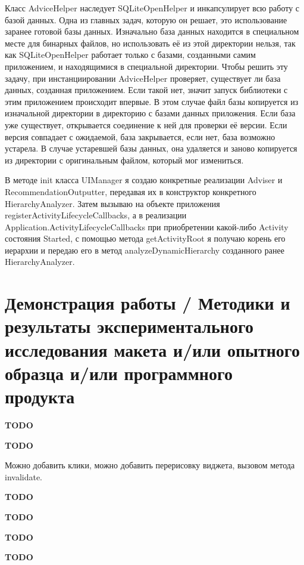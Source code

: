 \documentclass[a4paper,14pt]{extarticle} %
\begin{document}
	Класс AdviceHelper наследует SQLiteOpenHelper и инкапсулирует всю работу с базой данных. Одна из главных задач, которую он решает, это использование заранее готовой базы данных. Изначально база данных находится в специальном месте для бинарных файлов, но использовать её из этой директории нельзя, так как SQLiteOpenHelper работает только с базами, созданными самим приложением, и находящимися в специальной директории. Чтобы решить эту задачу, при инстанциировании AdviceHelper проверяет, существует ли база данных, созданная приложением. Если такой нет, значит запуск библиотеки с этим приложением происходит впервые. В этом случае файл базы копируется из изначальной директории в директорию с базами данных приложения. Если база уже существует, открывается соединение к ней для проверки её версии. Если версия совпадает с ожидаемой, база закрывается, если нет, база возможно устарела. В случае устаревшей базы данных, она удаляется и заново копируется из директории с оригинальным файлом, который мог измениться.
	
	В методе init класса UIManager я создаю конкретные реализации Adviser и RecommendationOutputter, передавая их в конструктор конкретного HierarchyAnalyzer. Затем вызываю на объекте приложения registerActivityLifecycleCallbacks, а в реализации Application.ActivityLifecycleCallbacks при приобретении какой-либо Activity состояния Started, с помощью метода getActivityRoot я получаю корень его иерархии и передаю его в метод analyzeDynamicHierarchy созданного ранее HierarchyAnalyzer.
	
	\newpage
	\section{Демонстрация работы / Методики и результаты экспериментального исследования макета и/или опытного образца и/или программного продукта}
	
	\textbf{\Huge TODO}
	
	\newpage
	
	\textbf{\Huge TODO}
	
	\newpage
	
	Можно добавить клики, можно добавить перерисовку виджета, вызовом метода invalidate.
	
	\textbf{\Huge TODO}
	
	\newpage
	
	\textbf{\Huge TODO}

	\newpage
	
	\textbf{\Huge TODO}
	
	\newpage
	
	\printbibliography[heading=none]
	
	\newpage
	
	\textbf{\Huge TODO}
\end{document}
